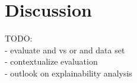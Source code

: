 
\chapter{Discussion}
\label{ch:Discussion}
TODO:\\
- evaluate and vs or and data set\\
- contextualize evaluation\\
- outlook on explainability analysis\\

